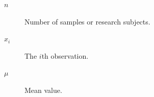 \begin{description}
  \item[$n$] Number of samples or research subjects.
  \item[$x_i$] The $i$th observation.
  \item[$\mu$] Mean value.
\end{description}
